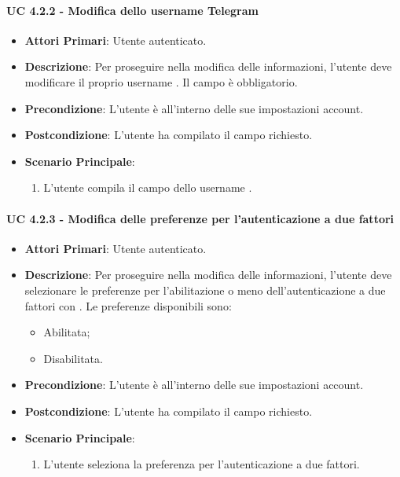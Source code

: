 				\paragraph{UC 4.2.2 - Modifica dello username Telegram}
				\begin{itemize}
					\item \textbf{Attori Primari}: Utente autenticato.
					\item \textbf{Descrizione}: Per proseguire nella modifica delle informazioni, l'utente deve modificare il proprio username . Il campo è obbligatorio.
					\item \textbf{Precondizione}: L'utente è all'interno delle sue impostazioni account.
					\item \textbf{Postcondizione}: L'utente ha compilato il campo richiesto.
					\item \textbf{Scenario Principale}:
					\begin{enumerate}
						\item L'utente compila il campo dello username .
					\end{enumerate}
				\end{itemize}

				\paragraph{UC 4.2.3 - Modifica delle preferenze per l'autenticazione a due fattori}
				\begin{itemize}
					\item \textbf{Attori Primari}: Utente autenticato.
					\item \textbf{Descrizione}: Per proseguire nella modifica delle informazioni, l'utente deve selezionare le preferenze per l'abilitazione o meno dell'autenticazione a due fattori con . Le preferenze disponibili sono:
					\begin{itemize}
						\item Abilitata;
						\item Disabilitata.
					\end{itemize}
					\item \textbf{Precondizione}: L'utente è all'interno delle sue impostazioni account.
					\item \textbf{Postcondizione}: L'utente ha compilato il campo richiesto.
					\item \textbf{Scenario Principale}:
					\begin{enumerate}
						\item L'utente seleziona la preferenza per l'autenticazione a due fattori.
					\end{enumerate}
				\end{itemize}


